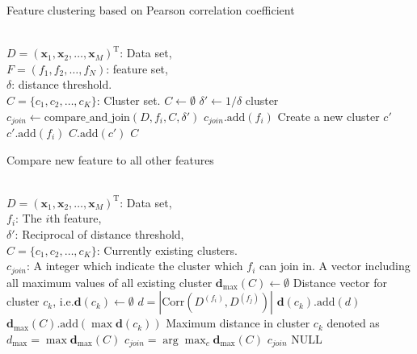 \documentclass{ieeeaccess}
\theoremstyle{definition}
\begin{document}
\begin{algorithm}
    \caption{Feature clustering based on Pearson correlation coefficient}
    \label{alg:clustering}
    \begin{algorithmic}[1]
    \REQUIRE ~~\\
        $D=(\bm{x}_1,\bm{x}_2,\ldots,\bm{x}_M)^\text{T}$: Data set, \\
        $F=(f_1,f_2,\ldots,f_N)$: feature set, \\
        $\delta$: distance threshold.
    \ENSURE ~~\\
        $C=\{c_1,c_2,\ldots,c_K\}$: Cluster set.
    \STATE $C \gets \emptyset$
    \STATE $\delta' \gets 1 / \delta$
            \STATE cluster $c_{join} \gets \text{compare\_and\_join}(D, f_i, C, \delta')$
                \STATE $c_{join}\text{.add}(f_i)$
            \ELSE
                \STATE Create a new cluster $c'$
                \STATE $c'\text{.add}(f_i)$
                \STATE $C\text{.add}(c')$
            \ENDIF
        \ENDIF
    \ENDFOR
    \RETURN $C$
    \end{algorithmic}
    \end{algorithm}

    \begin{algorithm}
    \caption{Compare new feature to all other features}
    \label{alg:compare-and-join}
    \begin{algorithmic}[1]
    \REQUIRE ~~\\
        $D=(\bm{x}_1,\bm{x}_2,\ldots,\bm{x}_M)^\text{T}$: Data set, \\
        $f_i$: The $i$th feature, \\
        $\delta'$: Reciprocal of distance threshold,\\
        $C=\{c_1, c_2, \ldots, c_K\}$: Currently existing clusters.
    \ENSURE ~~\\
        $c_{join}$: A integer which indicate the cluster which $f_i$ can join in.
    \STATE A vector including all maximum values of all existing cluster $\bm{d}_{\max}(C) \gets \emptyset$
        \STATE Distance vector for cluster $c_k$, i.e.$\bm{d}(c_k) \gets \emptyset$
            \STATE $d=|\text{Corr}(D^{(f_i)}, D^{(f_j)})|$
            \STATE $\bm{d}(c_k)\text{.add}(d)$
        \ENDFOR
        \STATE $\bm{d}_{\max}(C)\text{.add}(\max{\bm{d}(c_k)})$
    \ENDFOR
    \STATE Maximum distance in cluster $c_k$ denoted as $d_{\max}=\max{\bm{d}_{\max}(C)}$
        \STATE $c_{join}=\arg\max_c{\bm{d}_{\max}(C)}$
        \RETURN $c_{join}$
    \ELSE
        \RETURN NULL
    \ENDIF
    \end{algorithmic}
\end{algorithm}
\end{document}
